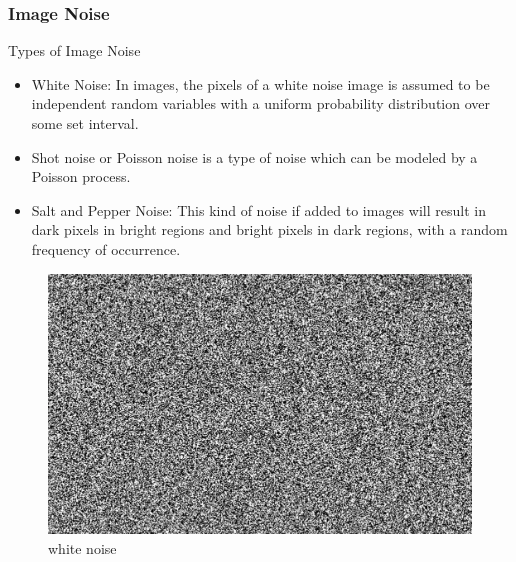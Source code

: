 \documentclass{beamer}
\begin{document}
\begin{frame}[plain]
\frametitle{Image Noise}
Types of Image Noise
    \begin{itemize}
        \item White Noise: In images, the pixels of a white noise image is assumed to be independent random variables with a uniform probability distribution over some set interval.
        
        \item Shot noise or Poisson noise is a type of noise which can be modeled by a Poisson process.
        \item Salt and Pepper Noise: This kind of noise if added to images will result in dark pixels in bright regions and bright pixels in dark regions, with a random frequency of occurrence.
    \end{itemize}
       \begin{figure}
        \begin{columns}[onlytextwidth]
            \begin{column}{0.3\textwidth}
                \centering
                \includegraphics[width=.7\linewidth]{img/noise.png}
               \caption{white noise}
               

\end{column}
\end{columns}
\end{figure}
\end{frame}
\end{document}
